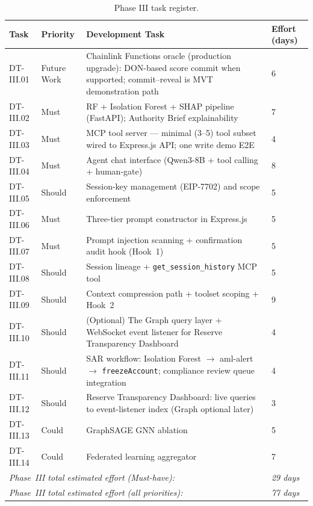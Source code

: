 \begin{table}[H]
\centering
\caption[Phase III task register]{Phase III task register.}
\label{tab:phaseIII-tasks}
\begin{tabular}{p{1.8cm}p{1.8cm}p{7.5cm}p{1.5cm}}
\toprule
\tableheadcolor
\textbf{Task} & \textbf{Priority} & \textbf{Development Task} & \textbf{Effort (days)} \\
\midrule
DT-III.01 & Future Work & Chainlink Functions oracle (production upgrade): DON-based score commit when supported; commit--reveal is MVT demonstration path & 6 \\
DT-III.02 & Must & RF + Isolation Forest + SHAP pipeline (FastAPI); Authority Brief explainability & 7 \\
DT-III.03 & Must & MCP tool server --- minimal (3--5) tool subset wired to Express.js API; one write demo E2E & 4 \\
DT-III.04 & Must & Agent chat interface (Qwen3-8B + tool calling + human-gate) & 8 \\
DT-III.05 & Should & Session-key management (EIP-7702) and scope enforcement & 5 \\
DT-III.06 & Must & Three-tier prompt constructor in Express.js & 5 \\
DT-III.07 & Must & Prompt injection scanning + confirmation audit hook (Hook~1) & 5 \\
DT-III.08 & Should & Session lineage + \texttt{get\_session\_history} MCP tool & 5 \\
DT-III.09 & Should & Context compression path + toolset scoping + Hook~2 & 9 \\
DT-III.10 & Should & (Optional) The Graph query layer + WebSocket event listener for Reserve Transparency Dashboard & 4 \\
DT-III.11 & Should & SAR workflow: Isolation Forest $\to$ aml-alert $\to$ \texttt{freezeAccount}; compliance review queue integration & 4 \\
DT-III.12 & Should & Reserve Transparency Dashboard: live queries to event-listener index (Graph optional later) & 3 \\
DT-III.13 & Could & GraphSAGE GNN ablation & 5 \\
DT-III.14 & Could & Federated learning aggregator & 7 \\
\multicolumn{3}{l}{\textit{Phase~III total estimated effort (Must-have):}} & \textit{29 days} \\
\multicolumn{3}{l}{\textit{Phase~III total estimated effort (all priorities):}} & \textit{77 days} \\
\bottomrule
\end{tabular}
\end{table}

